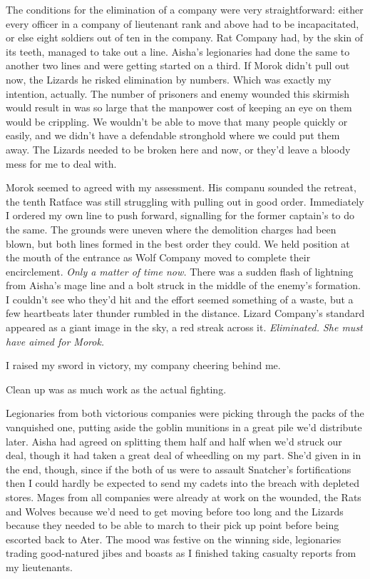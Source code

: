 \documentclass[12pt, openany]{book}
\begin{document}
The conditions for the elimination of a company were very straightforward: either every officer in a company of lieutenant rank and above had to be incapacitated, or else eight soldiers out of ten in the company. Rat Company had, by the skin of its teeth, managed to take out a line. Aisha’s legionaries had done the same to another two lines and were getting started on a third. If Morok didn’t pull out now, the Lizards he risked elimination by numbers. Which was exactly my intention, actually. The number of prisoners and enemy wounded this skirmish would result in was so large that the manpower cost of keeping an eye on them would be crippling. We wouldn’t be able to move that many people quickly or easily, and we didn’t have a defendable stronghold where we could put them away. The Lizards needed to be broken here and now, or they’d leave a bloody mess for me to deal with.

Morok seemed to agreed with my assessment. His companu sounded the retreat, the tenth Ratface was still struggling with pulling out in good order. Immediately I ordered my own line to push forward, signalling for the former captain’s to do the same. The grounds were uneven where the demolition charges had been blown, but both lines formed in the best order they could. We held position at the mouth of the entrance as Wolf Company moved to complete their encirclement. \textit{Only a matter of time now.} There was a sudden flash of lightning from Aisha’s mage line and a bolt struck in the middle of the enemy’s formation. I couldn’t see who they’d hit and the effort seemed something of a waste, but a few heartbeats later thunder rumbled in the distance. Lizard Company’s standard appeared as a giant image in the sky, a red streak across it. \textit{Eliminated. She must have aimed for Morok.}

I raised my sword in victory, my company cheering behind me.

Clean up was as much work as the actual fighting.

Legionaries from both victorious companies were picking through the packs of the vanquished one, putting aside the goblin munitions in a great pile we’d distribute later. Aisha had agreed on splitting them half and half when we’d struck our deal, though it had taken a great deal of wheedling on my part. She’d given in in the end, though, since if the both of us were to assault Snatcher’s fortifications then I could hardly be expected to send my cadets into the breach with depleted stores. Mages from all companies were already at work on the wounded, the Rats and Wolves because we’d need to get moving before too long and the Lizards because they needed to be able to march to their pick up point before being escorted back to Ater. The mood was festive on the winning side, legionaries trading good-natured jibes and boasts as I finished taking casualty reports from my lieutenants. 
\end{document}
